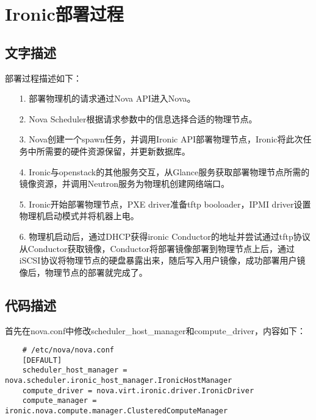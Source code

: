 \documentclass[a4paper,left=1.5cm,right=1.5cm,11pt]{article}
\begin{document}
\section{Ironic部署过程}
\subsection{文字描述}
	部署过程描述如下：
	\begin{itemize}
		\item[1.] 部署物理机的请求通过Nova API进入Nova。
		\item[2.] Nova Scheduler根据请求参数中的信息选择合适的物理节点。
		\item[3.] Nova创建一个spawn任务，并调用Ironic API部署物理节点，Ironic将此次任务中所需要的硬件资源保留，并更新数据库。
		\item[4.] Ironic与openstack的其他服务交互，从Glance服务获取部署物理节点所需的镜像资源，并调用Neutron服务为物理机创建网络端口。
		\item[5.] Ironic开始部署物理节点，PXE driver准备tftp booloader，IPMI driver设置物理机启动模式并将机器上电。
		\item[6.] 物理机启动后，通过DHCP获得ironic Conductor的地址并尝试通过tftp协议从Conductor获取镜像，Conductor将部署镜像部署到物理节点上后，通过iSCSI协议将物理节点的硬盘暴露出来，随后写入用户镜像，成功部署用户镜像后，物理节点的部署就完成了。
	\end{itemize}

\subsection{代码描述}
	首先在nova.conf中修改scheduler\_host\_manager和compute\_driver，内容如下：
	\begin{lstlisting}
	# /etc/nova/nova.conf
	[DEFAULT]
	scheduler_host_manager = nova.scheduler.ironic_host_manager.IronicHostManager
	compute_driver = nova.virt.ironic.driver.IronicDriver
	compute_manager = ironic.nova.compute.manager.ClusteredComputeManager
	\end{lstlisting}
\end{document}
